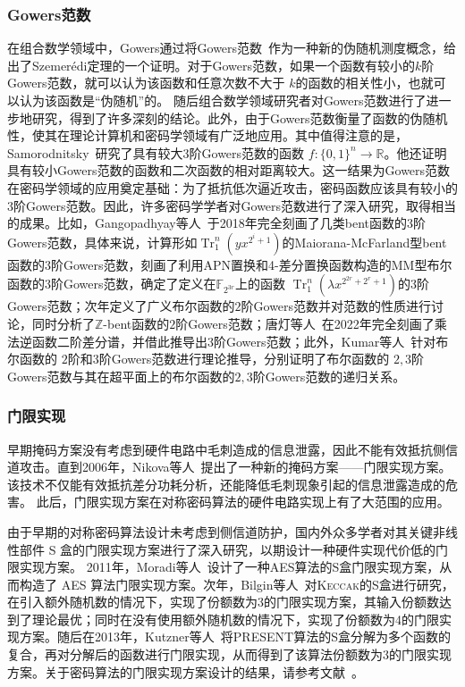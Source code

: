 \documentclass[a4paper,zihao=-4,AutoFakeBold]{ctexart}
\newcommand{\Tr}{\operatorname{Tr}_1^n}
\newcommand{\F}{\mathbb{F}}
\newcommand{\Z}{\mathbb{Z}}
\begin{document}
\subsubsection{Gowers范数}
在组合数学领域中，Gowers通过将Gowers范数~\cite{Gowers1998A}作为一种新的伪随机测度概念，给出了Szemer\'edi定理的一个证明。对于Gowers范数，如果一个函数有较小的$k$阶Gowers范数，就可以认为该函数和任意次数不大于 $k$的函数的相关性小，也就可以认为该函数是``伪随机''的。
随后组合数学领域研究者对Gowers范数进行了进一步地研究，得到了许多深刻的结论。此外，由于Gowers范数衡量了函数的伪随机性，使其在理论计算机和密码学领域有广泛地应用。其中值得注意的是，Samorodnitsky~\cite{SamSTOCy07}研究了具有较大$3$阶Gowers范数的函数 $f:\{0,1\}^n\to\mathbb{R}$。他还证明具有较小Gowers范数的函数和二次函数的相对距离较大。这一结果为Gowers范数在密码学领域的应用奠定基础：为了抵抗低次逼近攻击，密码函数应该具有较小的$3$阶Gowers范数。因此，许多密码学学者对Gowers范数进行了深入研究，取得相当的成果。比如，Gangopadhyay等人~\cite{GMS18}于2018年完全刻画了几类bent函数的$3$阶Gowers范数，具体来说，计算形如$\Tr(yx^{2^i+1})$的Maiorana-McFarland型bent函数的$3$阶Gowers范数，刻画了利用APN置换和4-差分置换函数构造的MM型布尔函数的$3$阶Gowers范数，确定了定义在$\F_{2^{3r}}$上的函数 $\Tr(\lambda x^{2^{2r}+2^r+1})$的$3$阶Gowers范数；次年定义了广义布尔函数的$2$阶Gowers范数并对范数的性质进行讨论，同时分析了$\Z$-bent函数的$2$阶Gowers范数；唐灯等人~\cite{InverseFuncDAM2021}在2022年完全刻画了乘法逆函数二阶差分谱，并借此推导出$3$阶Gowers范数；此外，Kumar等人~\cite{KumarMG23u2u3}针对布尔函数的 $2$阶和$3$阶Gowers范数进行理论推导，分别证明了布尔函数的 $2,3$阶Gowers范数与其在超平面上的布尔函数的$2,3$阶Gowers范数的递归关系。

\subsubsection{门限实现}
早期掩码方案没有考虑到硬件电路中毛刺造成的信息泄露，因此不能有效抵抗侧信道攻击。直到2006年，Nikova等人~\cite{Nikova06TI}提出了一种新的掩码方案——门限实现方案。该技术不仅能有效抵抗差分功耗分析，还能降低毛刺现象引起的信息泄露造成的危害。
此后，门限实现方案在对称密码算法的硬件电路实现上有了大范围的应用。

由于早期的对称密码算法设计未考虑到侧信道防护，国内外众多学者对其关键非线性部件 S 盒的门限实现方案进行了深入研究，以期设计一种硬件实现代价低的门限实现方案。
2011年，Moradi等人~\cite{moradiPushingLimitsVery2011}设计了一种AES算法的S盒门限实现方案，从而构造了 AES 算法门限实现方案。次年，Bilgin等人~\cite{BilginCARDIS13}对\textsc{Keccak}的S盒进行研究，在引入额外随机数的情况下，实现了份额数为3的门限实现方案，其输入份额数达到了理论最优；同时在没有使用额外随机数的情况下，实现了份额数为4的门限实现方案。随后在2013年，Kutzner等人~\cite{kutzner13decomposeSbox_TI}将PRESENT算法的S盒分解为多个函数的复合，再对分解后的函数进行门限实现，从而得到了该算法份额数为$3$的门限实现方案。关于密码算法的门限实现方案设计的结果，请参考文献~\cite{GrossDSD15,BilginNNRSCHES12,BilginNNRTVCCDS15,BilginGNNRAsiacrypt14}。
\end{document}
